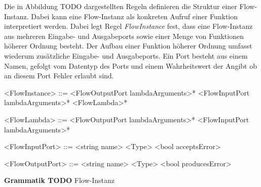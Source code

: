 \documentclass{article}
\begin{document}
    Die in Abbildung TODO dargestellten Regeln definieren die Struktur einer Flow-Instanz. Dabei kann eine Flow-Instanz als konkreten Aufruf einer Funktion interpretiert werden. 
    Dabei legt Regel \textit{FlowInstance} fest, dass eine Flow-Instanz aus mehreren Eingabe- und Ausgabeports sowie einer Menge von Funktionen höherer Ordnung besteht.
    Der Aufbau einer Funktion höherer Ordnung umfasst wiederum zusätzliche Eingabe- und Ausgabeports.
    Ein Port besteht aus einem Namen, gefolgt vom Datentyp des Ports und einem Wahrheitswert der Angibt ob an diesem Port Fehler erlaubt sind.\\
    \begin{grammar}
        <FlowInstance> ::= <FlowOutputPort lambdaArguments>* <FlowInputPort lambdaArguments>* <FlowLambda>*
        
        <FlowLambda> ::= <FlowOutputPort lambdaArguments>* <FlowInputPort lambdaArguments>*

        <FlowInputPort> ::= <string name> <Type> <bool acceptsError>

        <FlowOutputPort> ::= <string name> <Type> <bool producesError>
    \end{grammar}
    \textbf{Grammatik TODO} Flow-Instanz\\
    \\
\end{document}
